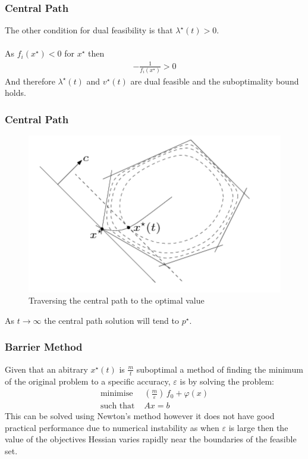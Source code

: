 \documentclass{beamer}
\begin{document}
\begin{frame}
    \frametitle{Central Path}
    The other condition for dual feasibility is that $\lambda^{\star}(t) >
    0$.
    \\~\\
    As $f_{i}(x^{\star}) < 0$ for $x^{\star}$ then
    \begin{align*}
        -\frac{1}{f_{i}(x^{\star})} > 0
    \end{align*}
    And therefore $\lambda^{\star}(t)$ and
    $v^{\star}(t)$ are dual feasible and the suboptimality bound holds.
\end{frame}


\begin{frame}
    \frametitle{Central Path}
    \begin{figure}[t]
        \centering
        \includegraphics[scale=0.25]{central_path}
        \caption{Traversing the central path to the optimal value}
        \label{fig:central path}
    \end{figure}
    \vspace{-5mm}
    As $t \rightarrow \infty$ the central path solution will tend to
    $p^{\star}$.
\end{frame}

\begin{frame}
    \frametitle{Barrier Method}
    Given that an abitrary $x^{\star}(t)$ is $\frac{m}{t}$ suboptimal a method of
    finding the minimum of the original problem to a specific accuracy,
    $\varepsilon$ is by solving the problem:
    \begin{align*}
        \text{minimise } \, &\left(\frac{m}{\varepsilon}\right)\,f_{0} +
        \varphi(x)\\
        \text{such that } & Ax =b
    \end{align*}
    This can be solved using Newton's method however it does not have good
    practical performance due to numerical instability as when  $\varepsilon$
    is large then the value of the objectives Hessian varies rapidly near the
    boundaries of the feasible set.
\end{frame}
\end{document}
